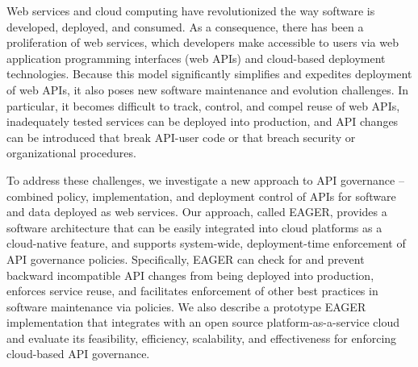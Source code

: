 Web services and cloud computing have revolutionized the way software is
developed, deployed, and consumed.  As a consequence, there has been a
proliferation of web services, which developers make accessible to users via
web application programming interfaces (web APIs) and cloud-based deployment
technologies.  Because this model significantly simplifies and expedites
deployment of web APIs, it also poses new software maintenance and evolution
challenges.  In particular, it becomes difficult to track, control, and compel
reuse of web APIs, inadequately tested services can be
deployed into production, and API changes can be introduced that
break API-user code or that breach security or organizational procedures.

To address these challenges, we investigate a new approach to API governance
-- combined policy, implementation, and deployment control of APIs for
software and data deployed as web services.  Our approach, called EAGER,
provides a software architecture that can be easily integrated into cloud
platforms as a cloud-native feature, and supports system-wide, 
deployment-time enforcement of API governance policies.
Specifically, EAGER can check for and
prevent backward incompatible API changes from
being deployed into production,
enforces service reuse, and facilitates enforcement of other best practices
in software maintenance via policies.  We also describe a prototype
EAGER implementation that
integrates with an open source platform-as-a-service cloud and
evaluate its feasibility, efficiency,
scalability, and effectiveness for enforcing cloud-based API governance.

